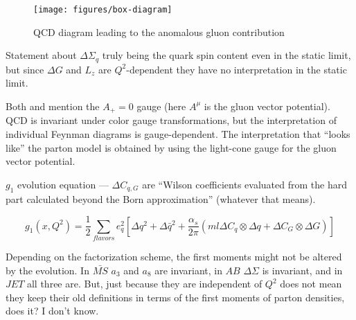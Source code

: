 \begin{figure}
  \centering
  \texttt{[image: figures/box-diagram]}
  \caption{QCD diagram leading to the anomalous gluon contribution}
  \label{fig:box-diagram}
\end{figure}

Statement about \(\Delta \Sigma_q\) truly being the quark spin content even in the static limit, but since \(\Delta G\) and \(L_z\) are \(Q^2\)-dependent they have no interpretation in the static limit.

Both \cite{Jaffe:2001dm} and \cite{Kuhn:2008sy} mention the \(A_{+} = 0\) gauge (here \(A^{\mu}\) is the gluon vector potential).  QCD is invariant under color gauge transformations, but the interpretation of individual Feynman diagrams is gauge-dependent.  The interpretation that ``looks like'' the parton model is obtained by using the light-cone gauge for the gluon vector potential.

\(g_1\) evolution equation --- $\Delta C_{q,G}$ are ``Wilson coefficients evaluated from the hard part calculated beyond the Born approximation'' (whatever that means).

\begin{equation}
  g_1(x, Q^2) = \frac{1}{2} \sum_{flavors} e_q^2 \left[\Delta q^2 + \Delta \bar{q}^2 + \frac{\alpha_s}{2 \pi} \left(ml\Delta C_q \otimes \Delta q + \Delta C_G \otimes \Delta G\right)\right]
\end{equation}

Depending on the factorization scheme, the first moments might not be altered
by the evolution. In $\bar{MS}$ $a_3$ and $a_8$ are invariant, in $AB$ $\Delta
\Sigma$ is invariant, and in $JET$ all three are. But, just because they are
independent of $Q^2$ does not mean they keep their old definitions in terms of
the first moments of parton densities, does it? I don't know.